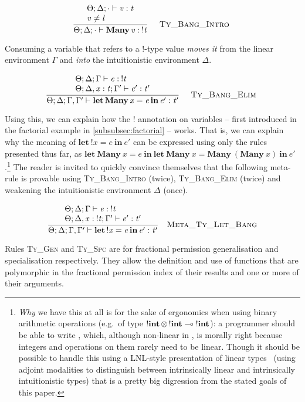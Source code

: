 \vspace{-\baselineskip}
\[
    {\displaystyle\frac{\begin{array}{l} \Theta ; \Delta ; \cdot \vdash \mathit{v} : \mathit{t} \\ \mathit{v} \neq \mathit{l} \\ \end{array}}{ \Theta ; \Delta ; \cdot \vdash \mathbf{Many} \, \mathit{v} : \: ! \mathit{t}}\quad\textsc{ {\textsc{Ty\_Bang\_Intro}}{} }}
\]

Consuming a variable that refers to a !-type value \emph{moves it} from the
linear environment $\Gamma$ and \emph{into} the intuitionistic environment
$\Delta$.

\vspace{-\baselineskip}
\[
    {\displaystyle\frac{\begin{array}{l} \Theta ; \Delta ; \Gamma \vdash \mathit{e} : \: ! \mathit{t} \\ \Theta ; \Delta , \mathit{x} : \mathit{t} ; \Gamma' \vdash \mathit{e'} : \mathit{t'} \\ \end{array}}{ \Theta ; \Delta ; \Gamma , \Gamma' \vdash \mathbf{let} \, \mathbf{Many} \, \mathit{x} = \mathit{e} \, \mathbf{in} \, \mathit{e'} : \mathit{t'}}\quad\textsc{ {\textsc{Ty\_Bang\_Elim}}{} }}
\]

Using this, we can explain how the ! annotation on variables -- first
introduced in the factorial example in \ref{subsubsec:factorial} -- works. That
is, we can explain why the meaning of $\mathbf{let}\ !x = e\ \mathbf{in}\ e'$
can be expressed using only the rules presented thus far, as $\mathbf{let\
Many}\ x = e\ \mathbf{in\ } \mathbf{let\ Many}\ x = \mathbf{Many}\
(\mathbf{Many}\ x)\ \mathbf{in}\ e'$.\footnote{\emph{Why} we have this at all
    is for the sake of ergonomics when using binary arithmetic operations
    (e.g.\ of type $!\mathbf{int} \, \otimes \, !\mathbf{int} \multimap \;
    !\mathbf{int}$): a programmer should be able to write \highl{let x = 5 + 5
    in x - x}, which, although non-linear in \highl{x}, is morally right
    because integers and operations on them rarely need to be linear. Though it
    should be possible to handle this using a LNL-style presentation of linear
    types~\cite{benton1995} (using adjoint modalities to distinguish between
    intrinsically linear and intrinsically intuitionistic types) that is a
    pretty big digression from the stated goals of this paper.}
The reader is invited to quickly convince themselves that the following
meta-rule is provable using \textsc{Ty\_Bang\_Intro} (twice),
\textsc{Ty\_Bang\_Elim} (twice) and weakening the intuitionistic environment
$\Delta$ (once).

\vspace{-\baselineskip}
\[
\ottdrule{%
\ottpremise{\Theta  \ottsym{;}  \Delta  \ottsym{;}  \Gamma  \vdash  \ottnt{e}  \ottsym{:}  \: !  \ottnt{t}}%
\ottpremise{\Theta  \ottsym{;}  \Delta  \ottsym{,}  \mathit{x}  \ottsym{:}  \: !  \ottnt{t}  \ottsym{;}  \Gamma'  \vdash  \ottnt{e'}  \ottsym{:}  \ottnt{t'}}%
}{
\Theta  \ottsym{;}  \Delta  \ottsym{;}  \Gamma  \ottsym{,}  \Gamma'  \vdash  \ottkw{let} \, ! \mathit{x} \ottsym{=} \ottnt{e} \, \ottkw{in} \, \ottnt{e'}  \ottsym{:}  \ottnt{t'}}{%
{\ottdrulename{Meta\_Ty\_Let\_Bang}}{}%
}
\]

Rules \textsc{Ty\_Gen} and \textsc{Ty\_Spc} are for fractional permission
generalisation and specialisation respectively. They allow the definition and
use of functions that are polymorphic in the fractional permission index of
their results and one or more of their arguments.

